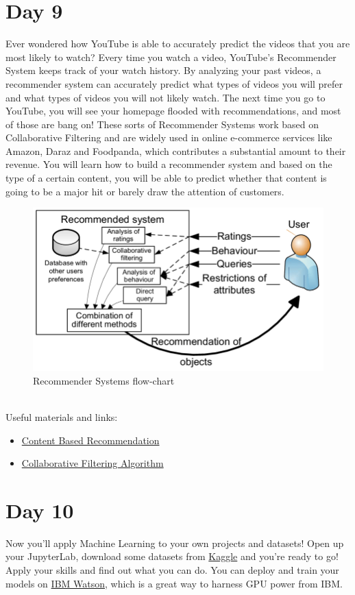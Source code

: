 \documentclass[11pt]{article}
\begin{document}
\section{Day 9}
Ever wondered how YouTube is able to accurately predict the videos that you are most likely to watch? Every time you watch a video, YouTube's Recommender System keeps track of your watch history. By analyzing your past videos, a recommender system can accurately predict what types of videos you will prefer and what types of videos you will not likely watch. The next time you go to YouTube, you will see your homepage flooded with recommendations, and most of those are bang on! These sorts of Recommender Systems work based on Collaborative Filtering and are widely used in online e-commerce services like Amazon, Daraz and Foodpanda, which contributes a substantial amount to their revenue. You will learn how to build a recommender system and based on the type of a certain content, you will be able to predict whether that content is going to be a major hit or barely draw the attention of customers.\\
\begin{figure}[h!]
\centering
\includegraphics[scale=.5]{img/rs.png}
{\caption*{Recommender Systems flow-chart}}
\end{figure}\\
Useful materials and links:
\begin{itemize}
\item \href{https://www.youtube.com/watch?v=9siFuMMHNIA}{Content Based Recommendation}
\item \href{https://www.youtube.com/watch?v=9AP-DgFBNP4}{Collaborative Filtering Algorithm}
\end{itemize}
\pagebreak
\section{Day 10}
Now you'll apply Machine Learning to your own projects and datasets! Open up your JupyterLab, download some datasets from \href{https://www.kaggle.com/datasets}{Kaggle} and you're ready to go! Apply your skills and find out what you can do. You can deploy and train your models on \href{https://www.ibm.com/cloud/machine-learning}{IBM Watson}, which is a great way to harness GPU power from IBM.
\end{document}

